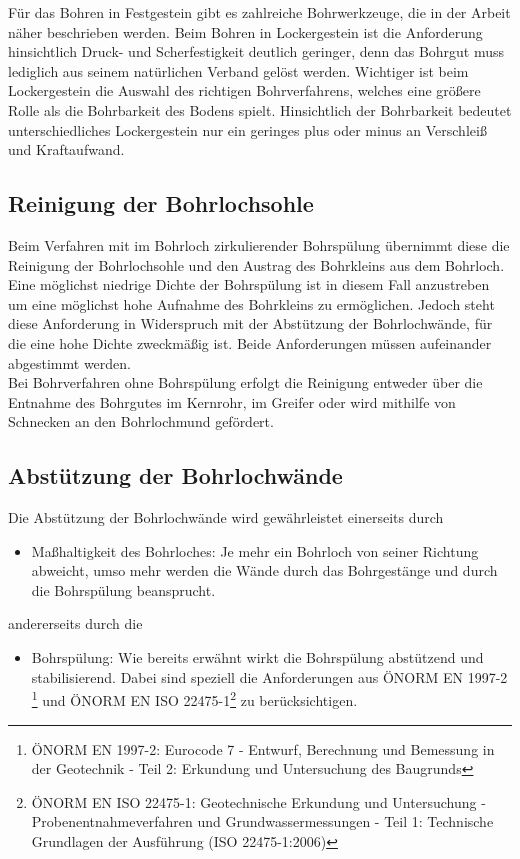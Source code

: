 \documentclass[12pt,a4paper,draft]{scrartcl} %
\begin{document}
Für das Bohren in Festgestein gibt es zahlreiche Bohrwerkzeuge, die in der Arbeit näher beschrieben werden. Beim Bohren in Lockergestein ist die Anforderung hinsichtlich Druck- und Scherfestigkeit deutlich geringer, denn das Bohrgut muss lediglich aus seinem natürlichen Verband gelöst werden. Wichtiger ist beim Lockergestein die Auswahl des richtigen Bohrverfahrens, welches eine größere Rolle als die Bohrbarkeit des Bodens spielt. Hinsichtlich der Bohrbarkeit bedeutet unterschiedliches Lockergestein nur ein geringes plus oder minus an Verschleiß und Kraftaufwand.\\

\subsection{Reinigung der Bohrlochsohle}
Beim Verfahren mit im Bohrloch zirkulierender Bohrspülung übernimmt diese die Reinigung der Bohrlochsohle und den Austrag des Bohrkleins aus dem Bohrloch. Eine möglichst niedrige Dichte der Bohrspülung ist in diesem Fall anzustreben um eine möglichst hohe Aufnahme des Bohrkleins zu ermöglichen. Jedoch steht diese Anforderung in Widerspruch mit der Abstützung der Bohrlochwände, für die eine hohe Dichte zweckmäßig ist. Beide Anforderungen müssen aufeinander abgestimmt werden.\\

Bei Bohrverfahren ohne Bohrspülung erfolgt die Reinigung entweder über die Entnahme des Bohrgutes im Kernrohr, im Greifer oder wird mithilfe von Schnecken an den Bohrlochmund gefördert.\\

\subsection{Abstützung der Bohrlochwände}
Die Abstützung der Bohrlochwände wird gewährleistet einerseits durch

\begin{itemize}
\item Maßhaltigkeit des Bohrloches: Je mehr ein Bohrloch von seiner Richtung abweicht, umso mehr werden die Wände durch das Bohrgestänge und durch die Bohrspülung beansprucht.
\end{itemize}

andererseits durch die

\begin{itemize}
\item 
Bohrspülung: Wie bereits erwähnt wirkt die Bohrspülung abstützend und stabilisierend. Dabei sind speziell die Anforderungen aus ÖNORM EN 1997-2 \footnote{ÖNORM EN 1997-2: Eurocode 7 - Entwurf, Berechnung und Bemessung in der Geotechnik - Teil 2: Erkundung und Untersuchung des Baugrunds} und ÖNORM EN ISO 22475-1\footnote{ÖNORM EN ISO 22475-1: Geotechnische Erkundung und Untersuchung - Probenentnahmeverfahren und Grundwassermessungen - Teil 1: Technische Grundlagen der Ausführung (ISO 22475-1:2006)} zu berücksichtigen.
\end{itemize}
\end{document}
